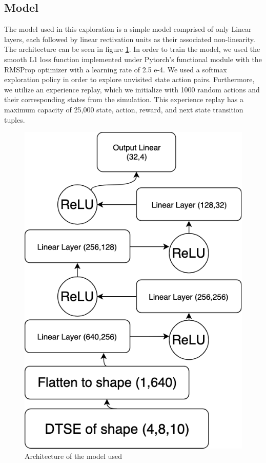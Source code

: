 \documentclass[12pt,twocolumn]{article}
\begin{document}
\subsection{Model}
The model used in this exploration is a simple model comprised of only Linear layers, each followed by linear rectivation units as their associated non-linearity. The architecture can be seen in figure \ref{fig:model_architecture}. In order to train the model, we used the smooth L1 loss function implemented under Pytorch's functional module with the RMSProp optimizer with a learning rate of 2.5 e-4. We used a softmax exploration policy in order to explore unvisited state action pairs. Furthermore, we utilize an experience replay, which we initialize with 1000 random actions and their corresponding states from the simulation. This experience replay has a maximum capacity of 25,000 state, action, reward, and next state transition tuples.

\begin{figure}
    \begin{center}
    \includegraphics[height=.25\textheight]{Figures/model_architecture}
    \caption{Architecture of the model used}
    \label{fig:model_architecture}
    \end{center}
\end{figure}
\end{document}
